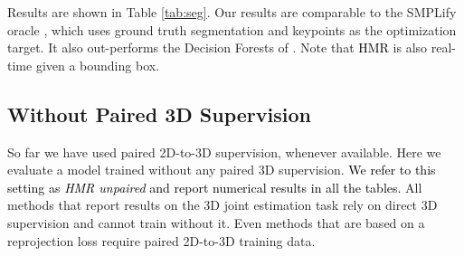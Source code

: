 \documentclass[10pt,twocolumn,letterpaper]{article}
\newcommand{\blue}[1]{\textcolor{black}{#1}}
\begin{document}
Results are shown in Table \ref{tab:seg}. 
Our results are comparable to the SMPLify oracle \cite{UP}, which uses ground truth segmentation and
keypoints as the optimization target. 
It also out-performs the Decision Forests of \cite{UP}. 
Note that \blue{HMR} is also real-time given a bounding box.


\begin{table}[]
\centering
{}
\caption{{\small {\bf Foreground and part segmentation (6 parts + bg) on LSP \cite{UP}.} Reporting average accuracy and F1-score (higher the
  better). \blue{Proposed HMR} is comparable to the oracle SMPLify which uses ground truth
 segmentation in fitting SMPL.}}
\label{tab:seg}
\vspace{-1em}
\end{table}


\subsection{Without Paired 3D Supervision}
\label{sec:no3d}
So far we have used paired 2D-to-3D supervision, \ie  whenever
available. 
Here we evaluate a model trained without any paired 3D supervision. \blue{We refer to
this setting as \emph{HMR unpaired} and report numerical results in all the 
tables.}
All methods that report results on the 3D joint estimation task rely on direct 3D
supervision and cannot train without it. 
Even methods that are based on a reprojection loss
\cite{Pavlakos,Fish2017,3dinterpreter} require paired 2D-to-3D training data.
\end{document}
